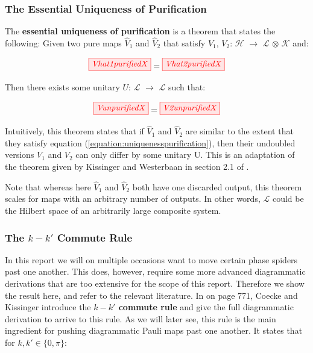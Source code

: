 \documentclass[]{article}
\begin{document}
\subsubsection{The Essential Uniqueness of Purification}
\label{section:essentialuniqueness}

The \textbf{essential uniqueness of purification} is a theorem that states the following: Given two pure maps $\hat{V}_1$ and $\hat{V}_2$ that satisfy $V_1$, $V_2$: $\mathcal{H}$ $\rightarrow$ $\mathcal{L}$ $\otimes$ $\mathcal{K}$ and:

\begin{equation}
	\label{equation:uniquenesspurification}
	\tikzfig{Vhat1purifiedX} = \tikzfig{Vhat2purifiedX}
\end{equation}

Then there exists some unitary $U$: $\mathcal{L}$ $\rightarrow$ $\mathcal{L}$ such that:

\begin{equation}
	\tikzfig{VunpurifiedX} = \tikzfig{V2unpurifiedX}
\end{equation}

Intuitively, this theorem states that if $\hat{V}_1$ and $\hat{V}_2$ are similar to the extent that they satisfy equation (\ref{equation:uniquenesspurification}), then their undoubled versions $V_1$ and $V_2$ can only differ by some unitary U. This is an adaptation of the theorem given by Kissinger and Westerbaan in section 2.1 of \cite{Kissinger2017}.

Note that whereas here $\hat{V}_1$ and $\hat{V}_2$ both have one discarded output, this theorem scales for maps with an arbitrary number of outputs. In other words, $\mathcal{L}$ could be the Hilbert space of an arbitrarily large composite system.

\subsubsection{The $k-k'$ Commute Rule}
\label{section:kkcommute}
In this report we will on multiple occasions want to move certain phase spiders past one another. This does, however, require some more advanced diagrammatic derivations that are too extensive for the scope of this report. Therefore we show the result here, and refer to the relevant literature. In \cite{Coecke2017} on page 771, Coecke and Kissinger introduce the \textbf{$k-k'$ commute rule} and give the full diagrammatic derivation to arrive to this rule. As we will later see, this rule is the main ingredient for pushing diagrammatic Pauli maps past one another. It states that for $k, k' \in \{0, \pi\}$: 
\end{document}
